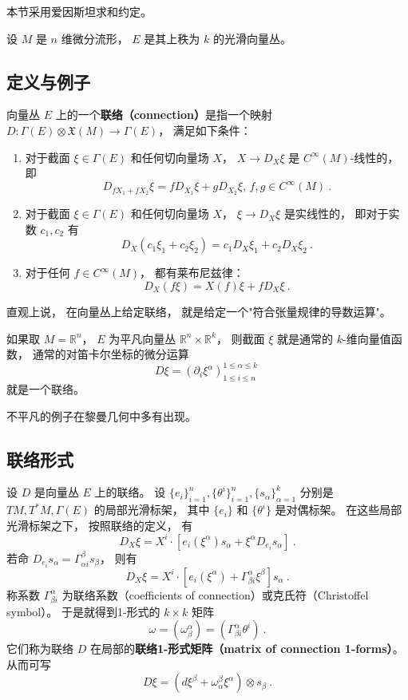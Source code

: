 
本节采用爱因斯坦求和约定。

设 $M$ 是 $n$ 维微分流形， $E$ 是其上秩为 $k$ 的光滑向量丛。 

\subsection{定义与例子}
向量丛 $E$ 上的一个\textbf{联络（connection）}是指一个映射 $D:\Gamma(E)\otimes \mathfrak{X}(M)\to\Gamma(E)$， 
满足如下条件：

\begin{enumerate}
\item 对于截面 $\xi\in\Gamma(E)$ 和任何切向量场 $X$， $X\to D_X\xi$ 是 $C^\infty(M)$-线性的， 即
$$
D_{fX_1+fX_2}\xi=fD_{X_1}\xi+gD_{X_2}\xi,\,f,g\in C^\infty(M)~.
$$
\item 对于截面 $\xi\in\Gamma(E)$ 和任何切向量场 $X$， $\xi\to D_X\xi$ 是实线性的， 即对于实数 $c_1,c_2$ 有
$$
D_X(c_1\xi_1+c_2\xi_2)=c_1D_X\xi_1+c_2D_X\xi_2~.
$$
\item 对于任何 $f\in C^\infty(M)$， 都有莱布尼兹律：
$$
D_X(f\xi)=X(f)\xi+fD_X\xi~.
$$
\end{enumerate}

直观上说， 在向量丛上给定联络， 就是给定一个"符合张量规律的导数运算"。 

如果取 $M=\mathbb{R}^n$， $E$ 为平凡向量丛 $\mathbb{R}^n\times\mathbb{R}^k$， 则截面 $\xi$ 就是通常的 $k$-维向量值函数， 通常的对笛卡尔坐标的微分运算
$$
D\xi=(\partial_i\xi^\alpha)_{1\leq i\leq n}^{1\leq\alpha\leq k}~
$$
就是一个联络。

不平凡的例子在黎曼几何中多有出现。

\subsection{联络形式}
设 $D$ 是向量丛 $E$ 上的联络。 设 $\{e_i\}_{i=1}^n,\{\theta^i\}_{i=1}^n,\{s_\alpha\}_{\alpha=1}^k$ 分别是 $TM,T^*M,\Gamma(E)$ 的局部光滑标架， 其中 $\{e_i\}$ 和 $\{\theta^i\}$ 是对偶标架。 在这些局部光滑标架之下， 按照联络的定义， 有
$$
D_X\xi=X^i\cdot\left[e_i(\xi^\alpha)s_\alpha+\xi^\alpha D_{e_i}s_\alpha\right]~.
$$
若命 $D_{e_i}s_\alpha=\Gamma_{\alpha i}^\beta s_\beta$， 则有
$$
D_X\xi=X^i\cdot\left[e_i(\xi^\alpha)+\Gamma_{\beta i}^\alpha\xi^\beta \right]s_\alpha~.
$$
称系数 $\Gamma^\alpha_{\beta i}$ 为联络系数（coefficients of connection）或克氏符（Christoffel symbol）。 于是就得到1-形式的 $k\times k$ 矩阵
$$
\omega=(\omega_\beta^\alpha)=(\Gamma_{\beta i}^\alpha\theta^i)~.
$$
它们称为联络 $D$ 在局部的\textbf{联络1-形式矩阵（matrix of connection 1-forms）}。 从而可写
$$
D\xi=(d\xi^\beta+\omega_\alpha^\beta\xi^\alpha)\otimes s_\beta~.
$$

